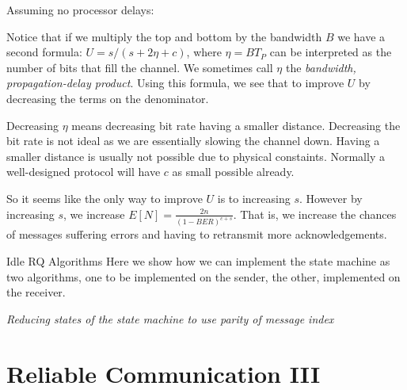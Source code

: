 Assuming no processor delays:

Notice that if we multiply the top and bottom by the bandwidth $B$ 
we have a second formula: $U = s/(s + 2\eta + c)$, where 
$\eta = BT_P$ can be interpreted as the number of bits that fill the channel.
We sometimes call $\eta$ the \textit{bandwidth, propagation-delay product}. 
Using this formula, we see that to improve $U$ by decreasing the terms on the denominator. 

Decreasing $\eta$ means decreasing bit rate having a smaller distance. 
Decreasing the bit rate is not ideal as we are essentially slowing the channel 
down. Having a smaller distance is usually not possible due to physical constaints. 
Normally a well-designed protocol will have $c$ as small possible already. 

So it seems like the only way to improve $U$ is to increasing $s$. 
However by increasing $s$, we increase $E[N] = \frac{2n}{(1-BER)^{c+s}}$. 
That is, we increase the chances of messages suffering errors and 
having to retransmit more acknowledgements. 

\frmrule

\begin{sidenote}{Idle RQ Algorithms}
Here we show how we can implement the state machine as 
two algorithms, one to be implemented on the sender, 
the other, implemented on the receiver.  

\end{sidenote}

\frmrule 

\textit{Reducing states of the state machine to use parity of message index}




\section{Reliable Communication III}

\frmrule 

